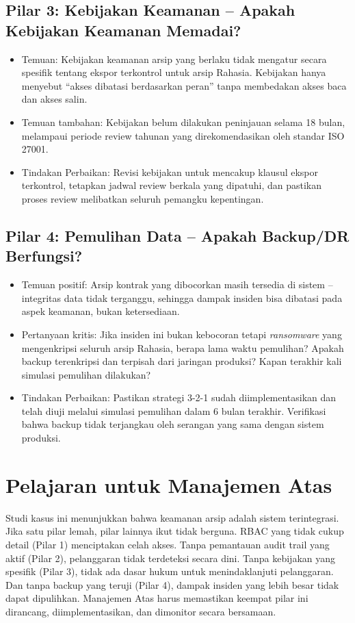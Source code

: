 \documentclass[12pt,a4paper]{report}
\begin{document}
\subsection{Pilar 3: Kebijakan Keamanan -- Apakah Kebijakan Keamanan Memadai?}
\begin{itemize}[leftmargin=*]
    \item Temuan: Kebijakan keamanan arsip yang berlaku tidak mengatur secara spesifik tentang ekspor terkontrol untuk arsip Rahasia. Kebijakan hanya menyebut ``akses dibatasi berdasarkan peran'' tanpa membedakan akses baca dan akses salin.
    \item Temuan tambahan: Kebijakan belum dilakukan peninjauan selama 18 bulan, melampaui periode review tahunan yang direkomendasikan oleh standar ISO 27001.
    \item Tindakan Perbaikan: Revisi kebijakan untuk mencakup klausul ekspor terkontrol, tetapkan jadwal review berkala yang dipatuhi, dan pastikan proses review melibatkan seluruh pemangku kepentingan.
\end{itemize}


\subsection{Pilar 4: Pemulihan Data -- Apakah Backup/DR Berfungsi?}
\begin{itemize}[leftmargin=*]
    \item Temuan positif: Arsip kontrak yang dibocorkan masih tersedia di sistem -- integritas data tidak terganggu, sehingga dampak insiden bisa dibatasi pada aspek keamanan, bukan ketersediaan.
    \item Pertanyaan kritis: Jika insiden ini bukan kebocoran tetapi \textit{ransomware} yang mengenkripsi seluruh arsip Rahasia, berapa lama waktu pemulihan? Apakah backup terenkripsi dan terpisah dari jaringan produksi? Kapan terakhir kali simulasi pemulihan dilakukan?
    \item Tindakan Perbaikan: Pastikan strategi 3-2-1 sudah diimplementasikan dan telah diuji melalui simulasi pemulihan dalam 6 bulan terakhir. Verifikasi bahwa backup tidak terjangkau oleh serangan yang sama dengan sistem produksi.
\end{itemize}


\section{Pelajaran untuk Manajemen Atas}
Studi kasus ini menunjukkan bahwa keamanan arsip adalah sistem terintegrasi. Jika satu pilar lemah, pilar lainnya ikut tidak berguna. RBAC yang tidak cukup detail (Pilar 1) menciptakan celah akses. Tanpa pemantauan audit trail yang aktif (Pilar 2), pelanggaran tidak terdeteksi secara dini. Tanpa kebijakan yang spesifik (Pilar 3), tidak ada dasar hukum untuk menindaklanjuti pelanggaran. Dan tanpa backup yang teruji (Pilar 4), dampak insiden yang lebih besar tidak dapat dipulihkan. Manajemen Atas harus memastikan keempat pilar ini dirancang, diimplementasikan, dan dimonitor secara bersamaan.
\end{document}

